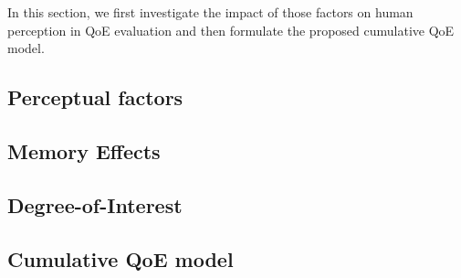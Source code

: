 In this section, we first investigate the impact of those factors on human perception in QoE evaluation and then formulate the proposed cumulative QoE model.

\subsection{Perceptual factors} \label{section:PerceptualFactors}


\subsection{Memory Effects} \label{section:MemoryEffects}


\subsection{Degree-of-Interest} \label{section:DoI}


\subsection{Cumulative QoE model} \label{section:CumulativeQoE}
